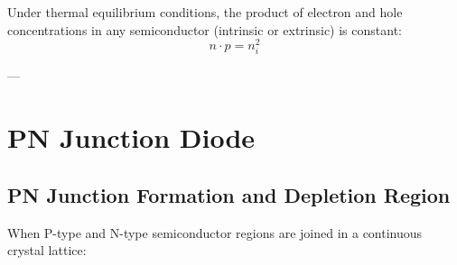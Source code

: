 \begin{keyequation}
Under thermal equilibrium conditions, the product of electron and hole concentrations in any semiconductor (intrinsic or extrinsic) is constant:
\begin{equation}
    n \cdot p = n_i^2
\end{equation}
\end{keyequation}

---

\section{PN Junction Diode}

\subsection{PN Junction Formation and Depletion Region}
When P-type and N-type semiconductor regions are joined in a continuous crystal lattice:

